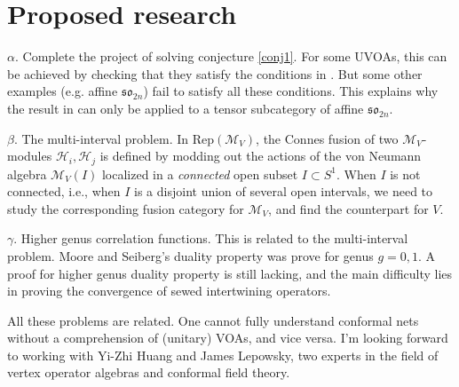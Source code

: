 \documentclass[10pt]{amsart}
\theoremstyle{definition}
\theoremstyle{plain}
\newcommand{\Rep}{\mathrm{Rep}}
\begin{document}
\section{Proposed research}

$\alpha.$ Complete the project of solving conjecture \ref{conj1}. For some UVOAs, this can be achieved by checking that  they satisfy the conditions in \cite{G equivalence}. But some other examples (e.g. affine $\mathfrak {so}_{2n}$) fail to satisfy all these conditions.  This explains why the result in \cite{G equivalence} can only be applied to a tensor subcategory of affine $\mathfrak {so}_{2n}$. 

$\beta$. The multi-interval problem. In $\Rep(\mathcal M_V)$, the Connes fusion of two $\mathcal M_V$-modules $\mathcal H_i,\mathcal H_j$ is defined by modding out the actions of the von Neumann algebra $\mathcal M_V(I)$ localized in a \emph{connected} open subset $I\subset S^1$. When $I$ is not connected, i.e., when $I$ is a disjoint union of several open intervals, we need to study the corresponding fusion category for $\mathcal M_V$, and find the counterpart for $V$.

$\gamma$. Higher genus correlation functions. This is related to the multi-interval problem. Moore and Seiberg's duality property was prove for genus $g=0,1$. A proof for higher genus duality property is still lacking, and the main difficulty lies in proving the convergence of sewed intertwining operators.

All these problems are related. One cannot fully understand conformal nets without  a comprehension of (unitary) VOAs, and vice versa.  I'm looking forward to working  with Yi-Zhi Huang and James Lepowsky, two experts in the field of vertex operator algebras and conformal field theory. 

 
\end{document}
